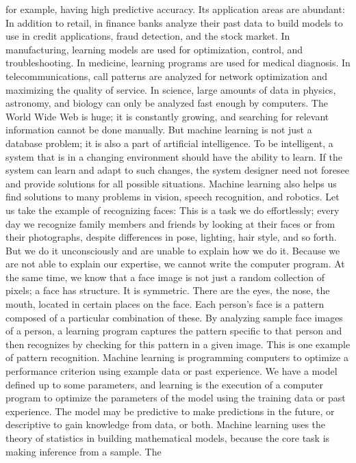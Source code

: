 for example, having high predictive accuracy. Its application areas are abundant: In addition to retail, in finance banks analyze their past data to build models to use in credit applications, fraud detection, and the stock market. In manufacturing, learning models are used for optimization, control, and troubleshooting. In medicine, learning programs are used for medical diagnosis. In telecommunications, call patterns are analyzed for network optimization and maximizing the quality of service. In science, large amounts of data in physics, astronomy, and biology can only be analyzed fast enough by computers. The World Wide Web is huge; it is constantly growing, and searching for relevant information cannot be done manually. But machine learning is not just a database problem; it is also a part of artificial intelligence. To be intelligent, a system that is in a changing environment should have the ability to learn. If the system can learn and adapt to such changes, the system designer need not foresee and provide solutions for all possible situations. Machine learning also helps us find solutions to many problems in vision, speech recognition, and robotics. Let us take the example of recognizing faces: This is a task we do effortlessly; every day we recognize family members and friends by looking at their faces or from their photographs, despite differences in pose, lighting, hair style, and so forth. But we do it unconsciously and are unable to explain how we do it. Because we are not able to explain our expertise, we cannot write the computer program. At the same time, we know that a face image is not just a random collection of pixels; a face has structure. It is symmetric. There are the eyes, the nose, the mouth, located in certain places on the face. Each person’s face is a pattern composed of a particular combination of these. By analyzing sample face images of a person, a learning program captures the pattern specific to that person and then recognizes by checking for this pattern in a given image. This is one example of pattern recognition. Machine learning is programming computers to optimize a performance criterion using example data or past experience. We have a model defined up to some parameters, and learning is the execution of a computer program to optimize the parameters of the model using the training data or past experience. The model may be predictive to make predictions in the future, or descriptive to gain knowledge from data, or both. Machine learning uses the theory of statistics in building mathematical models, because the core task is making inference from a sample. The

